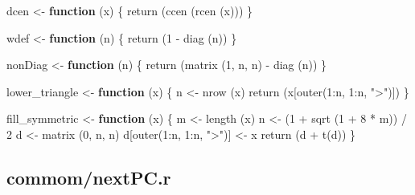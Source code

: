 \documentclass[
  12pt,
]{book}
\newenvironment{Shaded}{\begin{snugshade}}{\end{snugshade}}
\newcommand{\ControlFlowTok}[1]{\textcolor[rgb]{0.13,0.29,0.53}{\textbf{#1}}}
\newcommand{\DecValTok}[1]{\textcolor[rgb]{0.00,0.00,0.81}{#1}}
\newcommand{\FunctionTok}[1]{\textcolor[rgb]{0.00,0.00,0.00}{#1}}
\newcommand{\NormalTok}[1]{#1}
\newcommand{\OtherTok}[1]{\textcolor[rgb]{0.56,0.35,0.01}{#1}}
\newcommand{\SpecialCharTok}[1]{\textcolor[rgb]{0.00,0.00,0.00}{#1}}
\newcommand{\StringTok}[1]{\textcolor[rgb]{0.31,0.60,0.02}{#1}}
\theoremstyle{definition}
\theoremstyle{definition}
\theoremstyle{definition}
\theoremstyle{definition}
\theoremstyle{remark}
\begin{document}
\begin{Shaded}
\begin{Highlighting}[]
\NormalTok{dcen }\OtherTok{\textless{}{-}} \ControlFlowTok{function}\NormalTok{ (x) \{}
  \FunctionTok{return}\NormalTok{ (}\FunctionTok{ccen}\NormalTok{ (}\FunctionTok{rcen}\NormalTok{ (x)))}
\NormalTok{\}}


\NormalTok{wdef }\OtherTok{\textless{}{-}} \ControlFlowTok{function}\NormalTok{ (n) \{}
  \FunctionTok{return}\NormalTok{ (}\DecValTok{1} \SpecialCharTok{{-}} \FunctionTok{diag}\NormalTok{ (n))}
\NormalTok{\}}


\NormalTok{nonDiag }\OtherTok{\textless{}{-}} \ControlFlowTok{function}\NormalTok{ (n) \{}
  \FunctionTok{return}\NormalTok{ (}\FunctionTok{matrix}\NormalTok{ (}\DecValTok{1}\NormalTok{, n, n) }\SpecialCharTok{{-}} \FunctionTok{diag}\NormalTok{ (n))}
\NormalTok{\}}


\NormalTok{lower\_triangle }\OtherTok{\textless{}{-}} \ControlFlowTok{function}\NormalTok{ (x) \{}
\NormalTok{  n }\OtherTok{\textless{}{-}} \FunctionTok{nrow}\NormalTok{ (x)}
  \FunctionTok{return}\NormalTok{ (x[}\FunctionTok{outer}\NormalTok{(}\DecValTok{1}\SpecialCharTok{:}\NormalTok{n, }\DecValTok{1}\SpecialCharTok{:}\NormalTok{n, }\StringTok{"\textgreater{}"}\NormalTok{)])}
\NormalTok{\}}

\NormalTok{fill\_symmetric }\OtherTok{\textless{}{-}} \ControlFlowTok{function}\NormalTok{ (x) \{}
\NormalTok{  m }\OtherTok{\textless{}{-}} \FunctionTok{length}\NormalTok{ (x)}
\NormalTok{  n }\OtherTok{\textless{}{-}}\NormalTok{ (}\DecValTok{1} \SpecialCharTok{+} \FunctionTok{sqrt}\NormalTok{ (}\DecValTok{1} \SpecialCharTok{+} \DecValTok{8} \SpecialCharTok{*}\NormalTok{ m)) }\SpecialCharTok{/} \DecValTok{2}
\NormalTok{  d }\OtherTok{\textless{}{-}} \FunctionTok{matrix}\NormalTok{ (}\DecValTok{0}\NormalTok{, n, n)}
\NormalTok{  d[}\FunctionTok{outer}\NormalTok{(}\DecValTok{1}\SpecialCharTok{:}\NormalTok{n, }\DecValTok{1}\SpecialCharTok{:}\NormalTok{n, }\StringTok{"\textgreater{}"}\NormalTok{)] }\OtherTok{\textless{}{-}}\NormalTok{ x}
  \FunctionTok{return}\NormalTok{ (d }\SpecialCharTok{+} \FunctionTok{t}\NormalTok{(d))}
\NormalTok{\}}
\end{Highlighting}
\end{Shaded}

\hypertarget{appermcode}{%
\subsection{commom/nextPC.r}\label{appermcode}}
\end{document}
